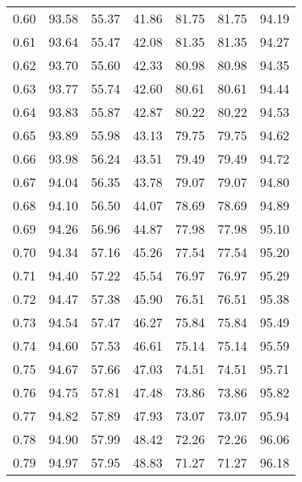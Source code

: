 \begin{tabular}{|c|c|c|c|c|c|c|}
      0.60 &     93.58 &     55.37 &      41.86 &   81.75 &      81.75 &         94.19 \\
      0.61 &     93.64 &     55.47 &      42.08 &   81.35 &      81.35 &         94.27 \\
      0.62 &     93.70 &     55.60 &      42.33 &   80.98 &      80.98 &         94.35 \\
      0.63 &     93.77 &     55.74 &      42.60 &   80.61 &      80.61 &         94.44 \\
      0.64 &     93.83 &     55.87 &      42.87 &   80.22 &      80.22 &         94.53 \\
      0.65 &     93.89 &     55.98 &      43.13 &   79.75 &      79.75 &         94.62 \\
      0.66 &     93.98 &     56.24 &      43.51 &   79.49 &      79.49 &         94.72 \\
      0.67 &     94.04 &     56.35 &      43.78 &   79.07 &      79.07 &         94.80 \\
      0.68 &     94.10 &     56.50 &      44.07 &   78.69 &      78.69 &         94.89 \\
      0.69 &     94.26 &     56.96 &      44.87 &   77.98 &      77.98 &         95.10 \\
      0.70 &     94.34 &     57.16 &      45.26 &   77.54 &      77.54 &         95.20 \\
      0.71 &     94.40 &     57.22 &      45.54 &   76.97 &      76.97 &         95.29 \\
      0.72 &     94.47 &     57.38 &      45.90 &   76.51 &      76.51 &         95.38 \\
      0.73 &     94.54 &     57.47 &      46.27 &   75.84 &      75.84 &         95.49 \\
      0.74 &     94.60 &     57.53 &      46.61 &   75.14 &      75.14 &         95.59 \\
      0.75 &     94.67 &     57.66 &      47.03 &   74.51 &      74.51 &         95.71 \\
      0.76 &     94.75 &     57.81 &      47.48 &   73.86 &      73.86 &         95.82 \\
      0.77 &     94.82 &     57.89 &      47.93 &   73.07 &      73.07 &         95.94 \\
      0.78 &     94.90 &     57.99 &      48.42 &   72.26 &      72.26 &         96.06 \\
      0.79 &     94.97 &     57.95 &      48.83 &   71.27 &      71.27 &         96.18 \\

\end{tabular}
